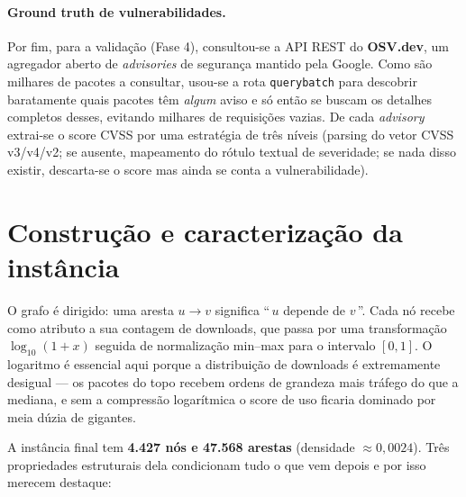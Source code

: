 \documentclass[11pt,a4paper]{article}
\begin{document}
\paragraph{Ground truth de vulnerabilidades.}
Por fim, para a validação (Fase 4), consultou-se a API REST do
\textbf{OSV.dev}, um agregador aberto de \emph{advisories} de segurança mantido pela
Google. Como são milhares de pacotes a consultar, usou-se a rota \texttt{querybatch}
para descobrir baratamente quais pacotes têm \emph{algum} aviso e só então se buscam
os detalhes completos desses, evitando milhares de requisições vazias. De cada
\emph{advisory} extrai-se o score CVSS por uma estratégia de três níveis (parsing
do vetor CVSS v3/v4/v2; se ausente, mapeamento do rótulo textual de severidade; se
nada disso existir, descarta-se o score mas ainda se conta a vulnerabilidade).

\section{Construção e caracterização da instância}\label{sec:instancia}

O grafo é dirigido: uma aresta $u \to v$ significa ``\,$u$ depende de $v$\,''. Cada
nó recebe como atributo a sua contagem de downloads, que passa por uma transformação
$\log_{10}(1+x)$ seguida de normalização min--max para o intervalo $[0,1]$. O
logaritmo é essencial aqui porque a distribuição de downloads é extremamente
desigual --- os pacotes do topo recebem ordens de grandeza mais tráfego do que a
mediana, e sem a compressão logarítmica o score de uso ficaria dominado por meia
dúzia de gigantes.

A instância final tem \textbf{4.427 nós e 47.568 arestas} (densidade
$\approx 0{,}0024$). Três propriedades estruturais dela condicionam tudo o que vem
depois e por isso merecem destaque:
\end{document}
